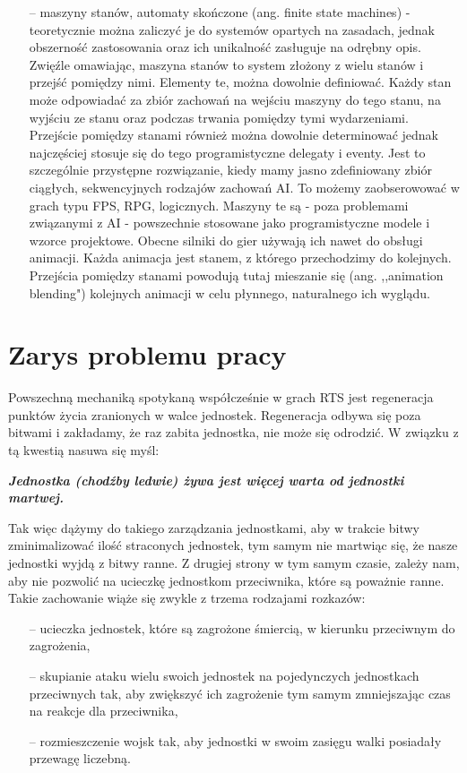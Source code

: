 \documentclass[12pt]{report}
\begin{document}
\begin{itemize}
\item[--] maszyny stanów, automaty skończone (ang. finite state machines) - teoretycznie można zaliczyć je do systemów opartych na zasadach, jednak obszerność zastosowania oraz ich unikalność zasługuje na odrębny opis. Zwięźle omawiając, maszyna stanów to system złożony z wielu stanów i przejść pomiędzy nimi. Elementy te, można dowolnie definiować. Każdy stan może odpowiadać za zbiór zachowań na wejściu maszyny do tego stanu, na wyjściu ze stanu oraz podczas trwania pomiędzy tymi wydarzeniami. Przejście pomiędzy stanami również można dowolnie determinować jednak najczęściej stosuje się do tego programistyczne delegaty i eventy. Jest to szczególnie przystępne rozwiązanie, kiedy mamy jasno zdefiniowany zbiór ciągłych, sekwencyjnych rodzajów zachowań AI. To możemy zaobserowować w grach typu FPS, RPG, logicznych. Maszyny te są - poza problemami związanymi z AI - powszechnie stosowane jako programistyczne modele i wzorce projektowe. Obecne silniki do gier używają ich nawet do obsługi animacji. Każda animacja jest stanem, z którego przechodzimy do kolejnych.  Przejścia pomiędzy stanami powodują tutaj mieszanie się (ang. ,,animation blending") kolejnych animacji w celu płynnego, naturalnego ich wyglądu.
\end{itemize}







\section {Zarys problemu pracy}
Powszechną mechaniką spotykaną współcześnie w grach RTS jest regeneracja punktów życia zranionych w walce jednostek. Regeneracja odbywa się poza bitwami i zakładamy, że raz zabita jednostka, nie może się odrodzić. W związku z tą kwestią nasuwa się myśl:

\textbf{\textit{Jednostka (chodźby ledwie) żywa jest więcej warta od jednostki martwej.}}

Tak więc dążymy do takiego zarządzania jednostkami, aby w trakcie bitwy zminimalizować ilość straconych jednostek, tym samym nie martwiąc się, że nasze jednostki wyjdą z bitwy ranne. Z drugiej strony w tym samym czasie, zależy nam, aby nie pozwolić na ucieczkę jednostkom przeciwnika, które są poważnie ranne. Takie zachowanie wiąże się zwykle z trzema rodzajami rozkazów:
\begin{itemize}
\item[--] ucieczka jednostek, które są zagrożone śmiercią, w kierunku przeciwnym do zagrożenia,
\item[--] skupianie ataku wielu swoich jednostek na pojedynczych jednostkach przeciwnych tak, aby zwiększyć ich zagrożenie tym samym zmniejszając czas na reakcje dla przeciwnika,
\item[--] rozmieszczenie wojsk tak, aby jednostki w swoim zasięgu walki posiadały przewagę liczebną.
\end{itemize}
\end{document}
